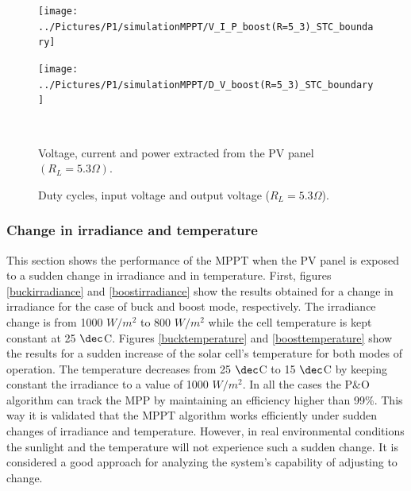 \begin{figure}[H]
	\begin{minipage}[c]{0.5\textwidth}
		\centering
		\texttt{[image: ../Pictures/P1/simulationMPPT/V\_I\_P\_boost(R=5\_3)\_STC\_boundary]} %
	\end{minipage}%
	\hfill
	\begin{minipage}[c]{0.5\textwidth}
		\centering
		\texttt{[image: ../Pictures/P1/simulationMPPT/D\_V\_boost(R=5\_3)\_STC\_boundary]} %
	\end{minipage} \\ %
	\begin{minipage}[t]{0.45\textwidth}
		\caption{Voltage, current and power extracted from the PV panel $(R_{L}=5.3\Omega)$.} %
		\label{boostboundary1}
	\end{minipage}%
	\hfill
	\begin{minipage}[t]{0.45\textwidth}
		\caption{Duty cycles, input voltage and output voltage ($R_{L}=5.3\Omega$).} %
		\label{boostboundary2}
	\end{minipage}
\end{figure}


\subsubsection*{Change in irradiance and temperature}

This section shows the performance of the MPPT when the PV panel is exposed to a sudden change in irradiance and in temperature. First, figures \ref{buckirradiance} and \ref{boostirradiance} show the results obtained for a change in irradiance for the case of buck and boost mode, respectively. The irradiance change is from 1000 $W/ m^2$ to 800 $W/ m^2$ while the cell temperature is kept constant at 25 $\dec$C. 
Figures \ref{bucktemperature} and \ref{boosttemperature}  show the results for a sudden increase of the solar cell's temperature for both modes of operation. The temperature decreases from 25 $\dec$C to 15 $\dec$C by keeping constant the irradiance to a value of 1000 $W/ m^2$. 
In all the cases the P\&O algorithm can track the MPP by maintaining an efficiency higher than 99\%. This way it is validated that the MPPT algorithm works efficiently under sudden changes of irradiance and temperature. However, in real environmental conditions the sunlight and the temperature will not experience such a sudden change. It is considered a good approach for analyzing the system's capability of adjusting to change.

